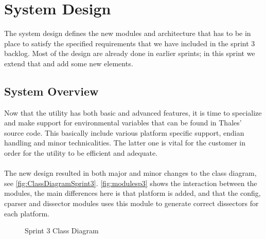 \section{System Design}
\label{sec:sp3:design}
The system design defines the new modules and architecture that has to be in place to satisfy the specified requirements that we have included in the sprint 3 backlog. Most of the design are already done in earlier sprints; in this sprint we extend that and add some new elements.

\subsection{System Overview}
Now that the \gls{utility} has both basic and advanced features, it is time to specialize and make support for environmental variables that can be found in Thales' source code. This basically include various platform specific support, \gls{endian} handling and minor technicalities. The latter one is vital for the customer in order for the \gls{utility} to be efficient and adequate. \\
\\
The new design resulted in both major and minor changes to the class diagram, see \autoref{fig:ClassDiagramSprint3}. \autoref{fig:modulesp3} shows the interaction between the modules, the main differences here is that platform is added, and that the config, cparser and dissector modules uses this module to generate correct dissectors for each platform.

\begin{figure}[htbp]
	\noindent{}
	\caption{Sprint 3 Class Diagram\label{fig:ClassDiagramSprint3}}
\end{figure}

